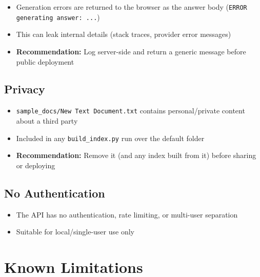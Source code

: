\documentclass[11pt,a4paper]{paper}
\begin{document}
\begin{itemize}
  \item Generation errors are returned to the browser as the answer body (\texttt{ERROR generating answer: ...})
  \item This can leak internal details (stack traces, provider error messages)
  \item \textbf{Recommendation:} Log server-side and return a generic message before public deployment
\end{itemize}

\subsection{Privacy}

\begin{itemize}
  \item \texttt{sample\_docs/New Text Document.txt} contains personal/private content about a third party
  \item Included in any \texttt{build\_index.py} run over the default folder
  \item \textbf{Recommendation:} Remove it (and any index built from it) before sharing or deploying
\end{itemize}

\subsection{No Authentication}

\begin{itemize}
  \item The API has no authentication, rate limiting, or multi-user separation
  \item Suitable for local/single-user use only
\end{itemize}

\section{Known Limitations}
\label{sec:limitations}
\end{document}
